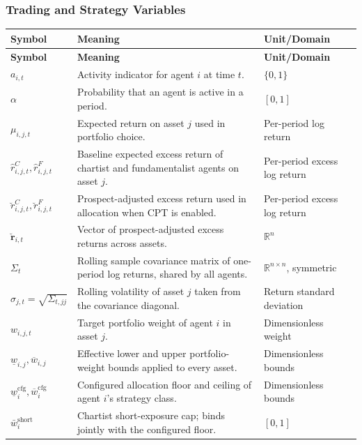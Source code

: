 \documentclass[12pt, a4paper]{article}
\begin{document}
    \subsubsection*{Trading and Strategy Variables}

    \begin{longtable}{@{}L{0.22\textwidth}L{0.50\textwidth}L{0.20\textwidth}@{}}
        \toprule
        \textbf{Symbol} & \textbf{Meaning} & \textbf{Unit/Domain} \\
        \midrule
        \endfirsthead
        \toprule
        \textbf{Symbol} & \textbf{Meaning} & \textbf{Unit/Domain} \\
        \midrule
        \endhead
        \(a_{i,t}\) & Activity indicator for agent \(i\) at time \(t\). & \(\{0,1\}\) \\
        \(\alpha\) & Probability that an agent is active in a period. & \([0,1]\) \\
        \(\mu_{i,j,t}\) & Expected return on asset \(j\) used in portfolio choice. & Per-period log return \\
        \(\hat r_{i,j,t}^{C},\hat r_{i,j,t}^{F}\) & Baseline expected excess return of chartist and fundamentalist agents on asset \(j\). & Per-period excess log return \\
        \(\breve r_{i,j,t}^{C},\breve r_{i,j,t}^{F}\) & Prospect-adjusted excess return used in allocation when CPT is enabled. & Per-period excess log return \\
        \(\breve{\mathbf r}_{i,t}\) & Vector of prospect-adjusted excess returns across assets. & \(\mathbb{R}^{n}\) \\
        \(\Sigma_t\) & Rolling sample covariance matrix of one-period log returns, shared by all agents. & \(\mathbb{R}^{n\times n}\), symmetric \\
        \(\sigma_{j,t}=\sqrt{\Sigma_{t,jj}}\) & Rolling volatility of asset \(j\) taken from the covariance diagonal. & Return standard deviation \\
        \(w_{i,j,t}\) & Target portfolio weight of agent \(i\) in asset \(j\). & Dimensionless weight \\
        \(\underline w_{i,j},\overline w_{i,j}\) & Effective lower and upper portfolio-weight bounds applied to every asset. & Dimensionless bounds \\
        \(\underline w_i^{\text{cfg}},\overline w_i^{\text{cfg}}\) & Configured allocation floor and ceiling of agent \(i\)'s strategy class. & Dimensionless bounds \\
        \(\bar w_i^{\text{short}}\) & Chartist short-exposure cap; binds jointly with the configured floor. & \([0,1]\) \\

\end{longtable}
\end{document}
